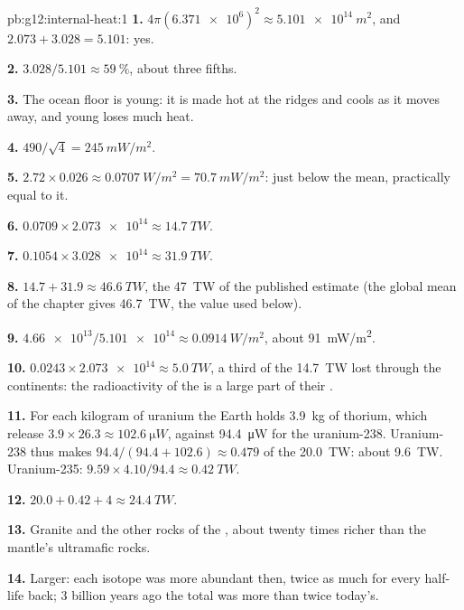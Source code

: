 \begin{solution}{pb:g12:internal-heat:1}
\textbf{1.} $4\pi (\num{6.371e6})^2 \approx \qty{5.101e14}{m^2}$, and
$2.073 + 3.028 = 5.101$: yes.

\textbf{2.} $3.028/5.101 \approx \qty{59}{\percent}$, about three fifths.

\textbf{3.} The ocean floor is young: it is made hot at the ridges and
cools as it moves away, and young  loses much heat.

\textbf{4.} $490/\sqrt{4} = \qty{245}{mW/m^2}$.

\textbf{5.} $2.72 \times 0.026 \approx \qty{0.0707}{W/m^2} =
\qty{70.7}{mW/m^2}$: just below the mean, practically equal to it.

\textbf{6.} $0.0709 \times \num{2.073e14} \approx \qty{14.7}{TW}$.

\textbf{7.} $0.1054 \times \num{3.028e14} \approx \qty{31.9}{TW}$.

\textbf{8.} $14.7 + 31.9 \approx \qty{46.6}{TW}$, the \qty{47}{TW} of the
published estimate (the global mean of the chapter gives \qty{46.7}{TW}, the
value used below).

\textbf{9.} $\num{4.66e13}/\num{5.101e14} \approx \qty{0.0914}{W/m^2}$,
about \qty{91}{mW/m^2}.

\textbf{10.} $0.0243 \times \num{2.073e14} \approx \qty{5.0}{TW}$, a third of
the \qty{14.7}{TW} lost through the continents: the radioactivity of the
 is a large part of their .

\textbf{11.} For each kilogram of uranium the Earth holds \qty{3.9}{kg} of
thorium, which release $3.9 \times 26.3 \approx \qty{102.6}{\micro W}$,
against \qty{94.4}{\micro W} for the uranium-238. Uranium-238 thus makes
$94.4/(94.4 + 102.6) \approx 0.479$ of the \qty{20.0}{TW}: about
\qty{9.6}{TW}. Uranium-235: $9.59 \times 4.10/94.4 \approx \qty{0.42}{TW}$.

\textbf{12.} $20.0 + 0.42 + 4 \approx \qty{24.4}{TW}$.

\textbf{13.} Granite and the other rocks of the , about
twenty times richer than the mantle's ultramafic rocks.

\textbf{14.} Larger: each isotope was more abundant then, twice as much for
every half-life back; 3 billion years ago the total was more than twice
today's.


\end{solution}

